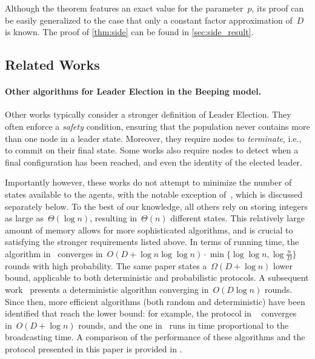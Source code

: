 \documentclass{article}
\newcommand{\rnote}[1]{{\color{myred} ({\bf Robin:} #1)}}
\newcommand{\inote}[1]{{\color{blue} ({\bf Isa:} #1)}}
\begin{document}
Although the theorem features an exact value for the parameter~$p$, its proof can be easily generalized to the case that only a constant factor approximation of~$D$ is known. The proof of \cref{thm:side} can be found in \cref{sec:side_result}.



\subsection{Related Works} \label{sec:related_works}


\paragraph{Other algorithms for Leader Election in the Beeping model.}

Other works typically consider
a stronger definition of Leader Election. They often enforce a {\em safety} condition, ensuring that the population never contains more than one node in a leader state. Moreover, they require nodes to {\em terminate}, i.e., to commit on their final state. Some works also require nodes to detect when a final configuration has been reached, and even the identity of the elected leader.

Importantly however, these works do not attempt to minimize the number of states available to the agents, with the notable exception of~\cite{gilbert_computational_2015}, which is discussed separately below. To the best of our knowledge, all others rely on storing integers as large as~$\Theta(\log n)$, resulting in~$\Theta(n)$ different states. This relatively large amount of memory allows for more sophisticated algorithms, and is crucial to satisfying the stronger requirements listed above.
In terms of running time, the algorithm in~\cite{GhaffariH13} converges in~$O(D + \log n \log \log n) \cdot \min \{ \log \log n, \log \frac{n}{D} \}$ rounds with high probability.
The same paper states a~$\Omega(D + \log n)$ lower bound, applicable to both deterministic and probabilistic protocols.
A subsequent work~\cite{ForsterSW14} presents a deterministic algorithm converging in~$O(D \log n)$ rounds.
Since then, more efficient algorithms (both random and deterministic) have been identified that reach the lower bound: for example, the protocol in ~\cite{DufoulonBB18} converges in~$O(D + \log n)$ rounds, and the one in~\cite{CzumajD19} runs in time proportional to the broadcasting time. A comparison of the performance of these algorithms and the protocol presented in this paper is provided in .
\end{document}
